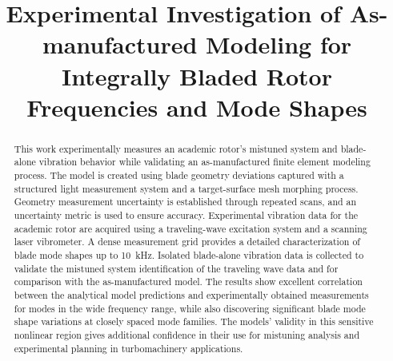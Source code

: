 \documentclass[colorlinks,upint,subscriptcorrection,varvw,hyphenate,balance,govt]{asmeconf}
\begin{document}

\title{Experimental Investigation of As-manufactured Modeling for Integrally Bladed Rotor Frequencies and Mode Shapes}



\maketitle

\begin{abstract}

    This work experimentally measures an academic rotor's mistuned system and blade-alone vibration behavior while validating an as-manufactured finite element modeling process. The model is created using blade geometry deviations captured with a structured light measurement system and a target-surface mesh morphing process. Geometry measurement uncertainty is established through repeated scans, and an uncertainty metric is used to ensure accuracy. Experimental vibration data for the academic rotor are acquired using a traveling-wave excitation system and a scanning laser vibrometer. A dense measurement grid provides a detailed characterization of blade mode shapes up to 10~kHz. Isolated blade-alone vibration data is collected to validate the mistuned system identification of the traveling wave data and for comparison with the as-manufactured model. The results show excellent correlation between the analytical model predictions and experimentally obtained measurements for modes in the wide frequency range, while also discovering significant blade mode shape variations at closely spaced mode families. The models' validity in this sensitive nonlinear region gives additional confidence in their use for mistuning analysis and experimental planning in turbomachinery applications.

\end{abstract}
\end{document}
